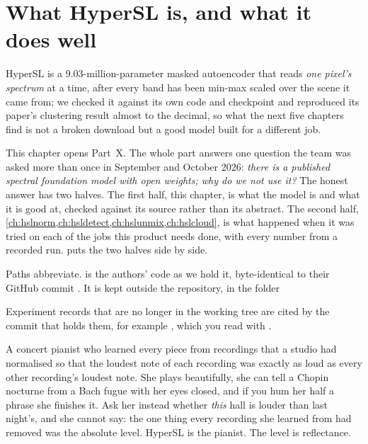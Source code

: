 \chapter{What HyperSL is, and what it does well}\label{ch:hslwhat}
\def\tbrk{\hfil\penalty50\hfilneg}%

\begin{onething}
HyperSL is a 9.03-million-parameter masked autoencoder that reads \emph{one pixel's spectrum} at a time, after every
band has been min-max scaled over the scene it came from; we checked it against its own code and checkpoint and
reproduced its paper's clustering result almost to the decimal, so what the next five chapters find is not a broken
download but a good model built for a different job.
\end{onething}

This chapter opens Part~X. The whole part answers one question the team was asked more than once in September and
October 2026: \emph{there is a published spectral foundation model with open weights; why do we not use it?} The
honest answer has two halves. The first half, this chapter, is what the model is and what it is good at, checked
against its source rather than its abstract. The second half, \cref{ch:hslnorm,ch:hsldetect,ch:hslunmix,ch:hslcloud},
is what happened when it was tried on each of the jobs this product needs done, with every number from a recorded
run.  puts the two halves side by side.

Paths abbreviate.  is the authors' code as we hold it, byte-identical to their GitHub commit
. It is kept outside the repository, in the folder
\begin{center}\end{center}
Experiment records that are no longer in the working tree are cited by the commit that holds them, for example
, which you read with
.

\begin{analogy}
A concert pianist who learned every piece from recordings that a studio had normalised so that the loudest note of
each recording was exactly as loud as every other recording's loudest note. She plays beautifully, she can tell a
Chopin nocturne from a Bach fugue with her eyes closed, and if you hum her half a phrase she finishes it. Ask her
instead whether \emph{this} hall is louder than last night's, and she cannot say: the one thing every recording
she learned from had removed was the absolute level. HyperSL is the pianist. The level is reflectance.
\end{analogy}

